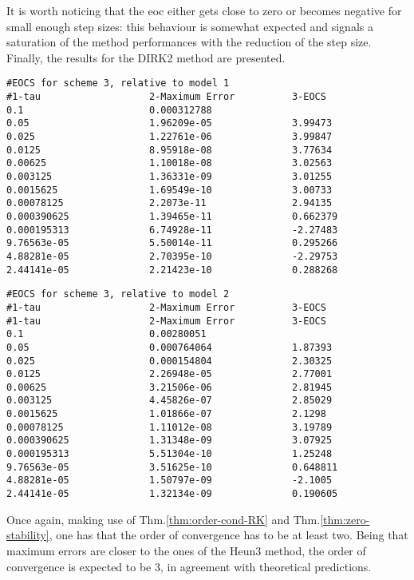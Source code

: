 \documentclass[11pt]{article}
\theoremstyle{theorem}
\theoremstyle{definition}
\begin{document}
It is worth noticing that the eoc either gets close to zero or becomes negative for small enough step sizes: this behaviour is somewhat expected and signals a saturation of the method performances with the reduction of the step size. \\

Finally, the results for the DIRK2 method are presented.\\

\begin{lstlisting}
#EOCS for scheme 3, relative to model 1
#1-tau                   2-Maximum Error          3-EOCS                   
0.1                      0.000312788              	
0.05                     1.96209e-05              3.99473
0.025                    1.22761e-06              3.99847
0.0125                   8.95918e-08              3.77634
0.00625                  1.10018e-08              3.02563
0.003125                 1.36331e-09              3.01255
0.0015625                1.69549e-10              3.00733
0.00078125               2.2073e-11               2.94135
0.000390625              1.39465e-11              0.662379
0.000195313              6.74928e-11              -2.27483
9.76563e-05              5.50014e-11              0.295266
4.88281e-05              2.70395e-10              -2.29753
2.44141e-05              2.21423e-10              0.288268
\end{lstlisting}

\begin{lstlisting}
#EOCS for scheme 3, relative to model 2
#1-tau                   2-Maximum Error          3-EOCS                   
#1-tau                   2-Maximum Error          3-EOCS                   
0.1                      0.00280051               	
0.05                     0.000764064              1.87393
0.025                    0.000154804              2.30325
0.0125                   2.26948e-05              2.77001
0.00625                  3.21506e-06              2.81945
0.003125                 4.45826e-07              2.85029
0.0015625                1.01866e-07              2.1298
0.00078125               1.11012e-08              3.19789
0.000390625              1.31348e-09              3.07925
0.000195313              5.51304e-10              1.25248
9.76563e-05              3.51625e-10              0.648811
4.88281e-05              1.50797e-09              -2.1005
2.44141e-05              1.32134e-09              0.190605
\end{lstlisting}

Once again, making use of Thm.\ref{thm:order-cond-RK} and Thm.\ref{thm:zero-stability}, one has that the order of convergence has to be at least two. Being that maximum errors are closer to the ones of the Heun3 method, the order of convergence is expected to be 3, in agreement with theoretical predictions.\\
\end{document}
